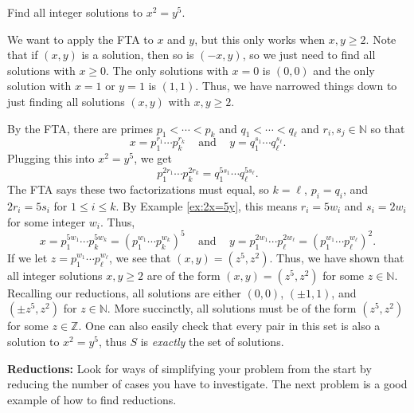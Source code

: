 \documentclass[11pt,dvipsnames]{book}
\numberwithin{equation}{section} %
\numberwithin{figure}{section} %
\numberwithin{table}{section} %
\begin{document}
\begin{exercise}
Find all integer solutions to $x^{2}=y^{5}$. \\

\begin{solution}
We want to apply the FTA to $x$ and $y$, but this only works when $x,y\geq 2$. Note that if $(x,y)$ is a solution, then so is $(-x,y)$, so we just need to find all solutions with $x\geq 0$. The only solutions with $x=0$ is $(0,0)$ and the only solution with $x=1$ or $y=1$ is $(1,1)$. Thus, we have narrowed things down to just finding all solutions $(x,y)$ with $x,y\geq 2$.

By the FTA, there are primes $p_{1}<\cdots <p_{k}$ and $q_{1}<\cdots <q_{\ell}$ and $r_{i},s_{j}\in \mathbb{N}$ so that
\[
x=p_{1}^{r_{1}}\cdots p_{k}^{r_{k}}\;\;\; \mbox{ and } \;\;\; y= q_1^{s_{1}}\cdots q_\ell^{s_{\ell}}.\]
Plugging this into $x^2=y^5$, we get 
\[
p_{1}^{2r_{1}}\cdots p_{k}^{2r_{k}} = q_1^{5s_{1}}\cdots q_\ell^{5s_{\ell}}.
\]
The FTA says these two factorizations must equal, so $k=\ell$, $p_i=q_i$, and $2r_{i}=5s_{i}$ for $1\leq i\leq k$. By Example \ref{ex:2x=5y}, this means $r_{i}=5w_{i}$ and $s_{i}=2w_{i}$ for some integer $w_{i}$. Thus,
\[
x=p_{1}^{5w_{1}}\cdots p_{k}^{5w_{k}}= \left(p_{1}^{w_{1}}\cdots p_{k}^{w_{k}}\right)^{5} \;\;\; \mbox{ and } \;\;\; 
y
=p_1^{2w_{1}}\cdots p_\ell^{2w_{\ell}} = \left(p_1^{w_{1}}\cdots p_\ell^{w_{\ell}}\right)^2.
\]
If we let $z=p_1^{w_{1}}\cdots p_\ell^{w_{\ell}}$, we see that $(x,y)=(z^{5},z^{2})$. Thus, we have shown that all integer solutions $x,y\geq 2$ are of the form $(x,y)=(z^{5},z^{2})$ for some $z\in\mathbb{N}$. Recalling our reductions, all solutions are either $(0,0)$, $(\pm 1,1)$, and $(\pm z^5,z^2)$ for $z\in\mathbb{N}$. More succinctly, all solutions must be of the form $( z^5,z^2)$ for some $z\in\mathbb{Z}$. One can also easily check that every pair in this set is also a solution to $x^2=y^5$, thus $S$ is {\it exactly} the set of solutions. 
\end{solution}
\end{exercise}



\begin{protip}
{\bf Reductions:} Look for ways of simplifying your problem from the start by reducing the number of cases you have to investigate. The next problem is a good example of how to find reductions.
\end{protip}
\end{document}
